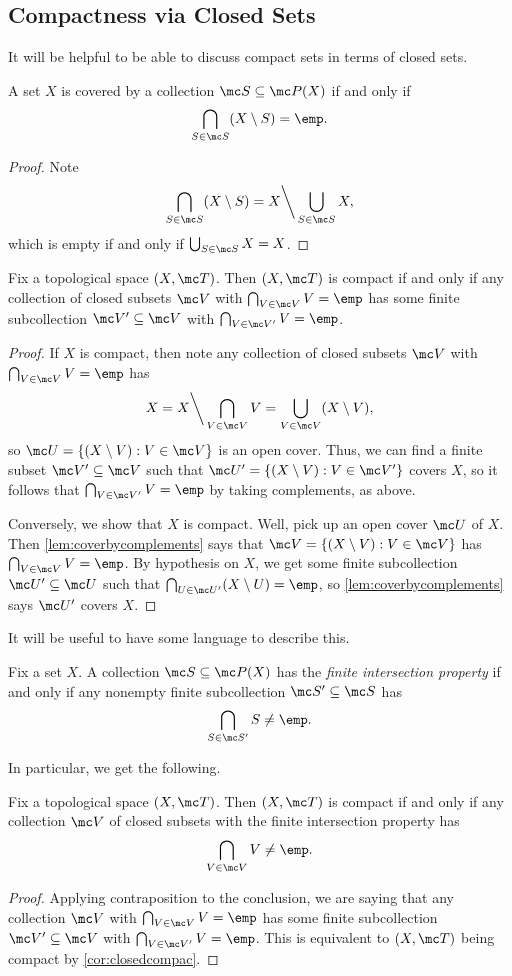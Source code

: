 \documentclass[../notes.tex]{subfiles}
\begin{document}
\subsection{Compactness via Closed Sets}
It will be helpful to be able to discuss compact sets in terms of closed sets.
\begin{lemma} \label{lem:coverbycomplements}
	A set $X$ is covered by a collection $\mc S\subseteq\mc P(X)$ if and only if
	\[\bigcap_{S\in\mc S}(X\setminus S)=\emp.\]
\end{lemma}
\begin{proof}
	Note
	\[\bigcap_{S\in\mc S}(X\setminus S)=X{\mathbin\bigg\backslash}\bigcup_{S\in\mc S}X,\]
	which is empty if and only if $\bigcup_{S\in\mc S}X=X$.
\end{proof}
\begin{corollary} \label{cor:closedcompac}
	Fix a topological space $(X,\mc T)$. Then $(X,\mc T)$ is compact if and only if any collection of closed subsets $\mc V$ with $\bigcap_{V\in\mc V}V=\emp$ has some finite subcollection $\mc V'\subseteq\mc V$ with $\bigcap_{V\in\mc V'}V=\emp$.
\end{corollary}
\begin{proof}
	If $X$ is compact, then note any collection of closed subsets $\mc V$ with $\bigcap_{V\in\mc V}V=\emp$ has
	\[X=X{\mathbin\bigg\backslash}\bigcap_{V\in\mc V}V=\bigcup_{V\in\mc V}(X\setminus V),\]
	so $\mc U=\{(X\setminus V):V\in\mc V\}$ is an open cover. Thus, we can find a finite subset $\mc V'\subseteq\mc V$ such that $\mc U'=\{(X\setminus V):V\in\mc V'\}$ covers $X$, so it follows that $\bigcap_{V\in\mc V'}V=\emp$ by taking complements, as above.

	Conversely, we show that $X$ is compact. Well, pick up an open cover $\mc U$ of $X$. Then \autoref{lem:coverbycomplements} says that $\mc V=\{(X\setminus V):V\in\mc V\}$ has $\bigcap_{V\in\mc V}V=\emp$. By hypothesis on $X$, we get some finite subcollection $\mc U'\subseteq\mc U$ such that $\bigcap_{U\in\mc U'}(X\setminus U)=\emp$, so \autoref{lem:coverbycomplements} says $\mc U'$ covers $X$.
\end{proof}
It will be useful to have some language to describe this.
\begin{definition}
	Fix a set $X$. A collection $\mc S\subseteq\mc P(X)$ has the \textit{finite intersection property} if and only if any nonempty finite subcollection $\mc S'\subseteq\mc S$ has
	\[\bigcap_{S\in\mc S'}S\ne\emp.\]
\end{definition}
In particular, we get the following.
\begin{proposition} \label{prop:compactviafip}
	Fix a topological space $(X,\mc T)$. Then $(X,\mc T)$ is compact if and only if any collection $\mc V$ of closed subsets with the finite intersection property has
	\[\bigcap_{V\in\mc V}V\ne\emp.\]
\end{proposition}
\begin{proof}
	Applying contraposition to the conclusion, we are saying that any collection $\mc V$ with $\bigcap_{V\in\mc V}V=\emp$ has some finite subcollection $\mc V'\subseteq\mc V$ with $\bigcap_{V\in\mc V'}V=\emp$. This is equivalent to $(X,\mc T)$ being compact by \autoref{cor:closedcompac}.
\end{proof}
\end{document}
